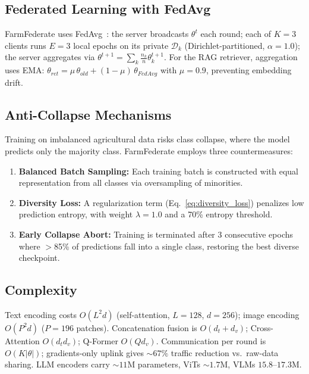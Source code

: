 \documentclass[10pt,journal,compsoc]{IEEEtran}
\begin{document}
\subsection{Federated Learning with FedAvg}

FarmFederate uses FedAvg~\cite{mcmahan2017communication}: the server broadcasts $\theta^t$ each round; each of $K{=}3$ clients runs $E{=}3$ local epochs on its private $\mathcal{D}_k$ (Dirichlet-partitioned, $\alpha{=}1.0$); the server aggregates via $\theta^{t+1} = \sum_k \frac{n_k}{n}\theta_k^{t+1}$. For the RAG retriever, aggregation uses EMA: $\theta_{ret} = \mu\,\theta_{old} + (1{-}\mu)\,\theta_{FedAvg}$ with $\mu{=}0.9$, preventing embedding drift.

\subsection{Anti-Collapse Mechanisms}

Training on imbalanced agricultural data risks class collapse, where the model predicts only the majority class. FarmFederate employs three countermeasures:

\begin{enumerate}
    \item \textbf{Balanced Batch Sampling:} Each training batch is constructed with equal representation from all classes via oversampling of minorities.

    \item \textbf{Diversity Loss:} A regularization term (Eq.~\ref{eq:diversity_loss}) penalizes low prediction entropy, with weight $\lambda = 1.0$ and a 70\% entropy threshold.

    \item \textbf{Early Collapse Abort:} Training is terminated after 3 consecutive epochs where $>$85\% of predictions fall into a single class, restoring the best diverse checkpoint.
\end{enumerate}

\subsection{Complexity}

Text encoding costs $O(L^2 d)$ (self-attention, $L{=}128$, $d{=}256$); image encoding $O(P^2 d)$ ($P{=}196$ patches). Concatenation fusion is $O(d_t{+}d_v)$; Cross-Attention $O(d_t d_v)$; Q-Former $O(Q d_v)$. Communication per round is $O(K|\theta|)$; gradients-only uplink gives ${\sim}67\%$ traffic reduction vs.\ raw-data sharing. LLM encoders carry ${\sim}11$M parameters, ViTs ${\sim}1.7$M, VLMs $15.8$--$17.3$M.
\end{document}
